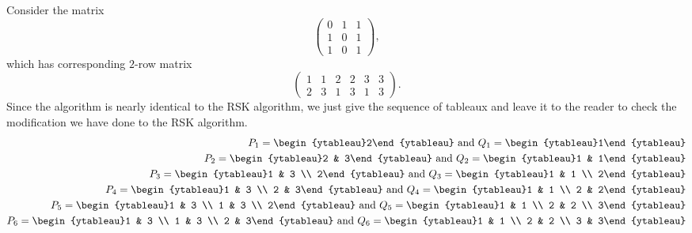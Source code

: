 	\begin{fex}
	Consider the matrix
	\[
	\begin{pmatrix}
		0 & 1 & 1 \\
		1 & 0 & 1 \\
		1 & 0 & 1
	\end{pmatrix},
	\]
	which has corresponding $2$-row matrix
	\[
	\begin{pmatrix}
		1 & 1 & 2 & 2 & 3 & 3 \\
		2 & 3 & 1 & 3 & 1 & 3
	\end{pmatrix}.
	\]
	Since the algorithm is nearly identical to the RSK algorithm, we just give the sequence of tableaux and leave it to the reader to check the modification we have done to the RSK algorithm.
	\begin{align*}
		P_1 = \begin{ytableau}2\end{ytableau} \text{ and } Q_1 = \begin{ytableau}1\end{ytableau} \\
		P_2 = \begin{ytableau}2 & 3\end{ytableau} \text{ and } Q_2 = \begin{ytableau}1 & 1\end{ytableau} \\
		P_3 = \begin{ytableau}1 & 3 \\ 2\end{ytableau} \text{ and } Q_3 = \begin{ytableau}1 & 1 \\ 2\end{ytableau} \\
		P_4 = \begin{ytableau}1 & 3 \\ 2 & 3\end{ytableau} \text{ and } Q_4 = \begin{ytableau}1 & 1 \\ 2 & 2\end{ytableau} \\
		P_5 = \begin{ytableau}1 & 3 \\ 1 & 3 \\ 2\end{ytableau} \text{ and } Q_5 = \begin{ytableau}1 & 1 \\ 2 & 2 \\ 3\end{ytableau} \\
		P_6 = \begin{ytableau}1 & 3 \\ 1 & 3 \\ 2 & 3\end{ytableau} \text{ and } Q_6 = \begin{ytableau}1 & 1 \\ 2 & 2 \\ 3 & 3\end{ytableau} \\
	\end{align*}
	\end{fex}

